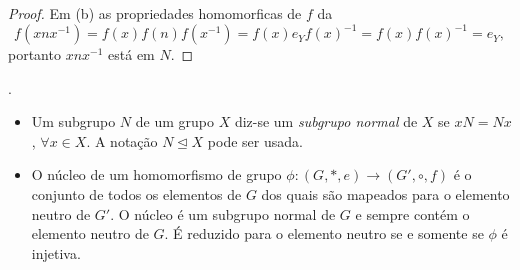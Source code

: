 \begin{definition}[Magma]
\begin{stat}
\begin{proof}
               Em (b) as propriedades homomorficas de $f$ da $$f(xnx^{-1})=f(x)f(n)f(x^{-1})=f(x)e_{Y}f(x)^{-1} = f(x)f(x)^{-1}=e_{Y},$$ portanto $xnx^{-1}$ está em $N$.
            \end{proof}
         \end{stat}
         \newpage
         \begin{definition}.
            \begin{itemize}
               \item Um subgrupo $N$ de um grupo $X$ diz-se um \emph{subgrupo normal} de $X$ se $xN = Nx$, $\forall x \in X$. A notação $N \trianglelefteq X$ pode ser usada.
               \item O núcleo de um homomorfismo de grupo $\phi: (G, * , e) \to (G', \circ , f)$ é o conjunto de todos os elementos de $G$ dos quais são mapeados para o elemento neutro de $G'$. O núcleo é um subgrupo normal de $G$ e sempre contém o elemento neutro de $G$. É reduzido para o elemento neutro se e somente se $\phi$ é injetiva.
            \end{itemize}


\end{definition}
\end{definition}
